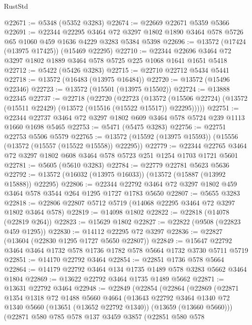 \begin{lexlean}{RustStd}
\begin{coremodule}
@22671 := @5348 (@5352 @3283)
@22674 := @22669 @22671 @5359 @5366
@22691 := @22344
    @22295
    @3464
    @72
    @3297
    @1802
    @1890
    @3464
    @578
    @5726
    @65
    @1060
    @459
    @1636
    @4229
    @3283
    @5384
    @5398
@22696 := @13572 (@17424 (@13975 @17425)) (@15469 @22295)
@22710 := @22344 @22696 @3464 @72 @3297 @1802 @1889 @3464 @578 @5725 @225 @1068 @1641 @1651 @5418
@22712 := @5422 (@5426 @3283)
@22715 := @22710 @22712 @5434 @5441
@22718 := @13572 (@16483 (@13975 @16484))
@22720 := @13572 (@15496 @22346)
@22723 := @13572 (@15501 (@13975 @15502))
@22724 := @13888 @22345
@22737 := @22718
    (@22720
      (@22723
        (@13572 (@15506 @22724) (@13572 (@15511 @22429) (@13572 (@15516 (@15522 @15517)) @22295)))))
@22751 := @22344 @22737 @3464 @72 @3297 @1802 @609 @3464 @578 @5724 @239 @1113 @1660 @1698 @5465
@22753 := @5471 (@5475 @3283)
@22756 := @22751 @22753 @5506 @5579
@22765 := @13572 (@15592 (@13975 @15593)) (@15556 (@13572 (@15557 (@15522 @15558)) @22295))
@22779 := @22344 @22765 @3464 @72 @3297 @1802 @608 @3464 @578 @5723 @251 @1254 @1703 @1721 @5601
@22781 := @5605 (@5610 @3283)
@22784 := @22779 @22781 @5623 @5636
@22792 := @13572 (@16032 (@13975 @16033)) (@13572 (@15887 (@13992 @15888)) @22295)
@22806 := @22344 @22792 @3464 @72 @3297 @1802 @459 @3464 @578 @3544 @264 @1295 @1727 @1783 @5650
@22807 := @5655 @3283
@22818 := @22806 @22807 @5712 @5719 (@14068 @22295 @3464 @72 @3297 @1802 @3464 @578)
@22819 := @14098 @1802
@22822 := @22818 (@14078 (@22819 @264))
@22823 := @15629 @1802
@22827 := @22822 (@9508 (@22823 @459 @1295))
@22830 := @14112 @22295 @72 @3297
@22836 := @22827 (@13604 (@22830 @1295 @1727 @5650 @22807))
@22849 := @15647 @22792 @3464 @3464 @1732 @578 @1736 @1782 @578 @5664 @1732 @3730 @5711 @5719
@22851 := @14170 @22792 @3464
@22854 := @22851 @1736 @578 @5664
@22864 := @14179 @22792 @3464 @134 @1735 @1489 @578 @3283 @5662 @3464 @1804
@22869 := @13622 @22792 @3464 @1735 @1489 @5662
@22871 := @13631 @22792 @3464
@22948 := @22849
    (@22854
      (@22864
        (@22869
          (@22871
            @1354
            @1318
            @72
            @1488
            @5660
            @4664
            (@13643
              @22792
              @3464
              @1340
              @72
              @1340
              @5660
              (@13651 (@13652 @22792 @1340))
              (@13659 (@13660 @5660)))
            (@22871
              @580
              @785
              @578
              @137
              @3459
              @3857
              (@22851
                @580
                @578

\end{coremodule}
\end{lexlean}
